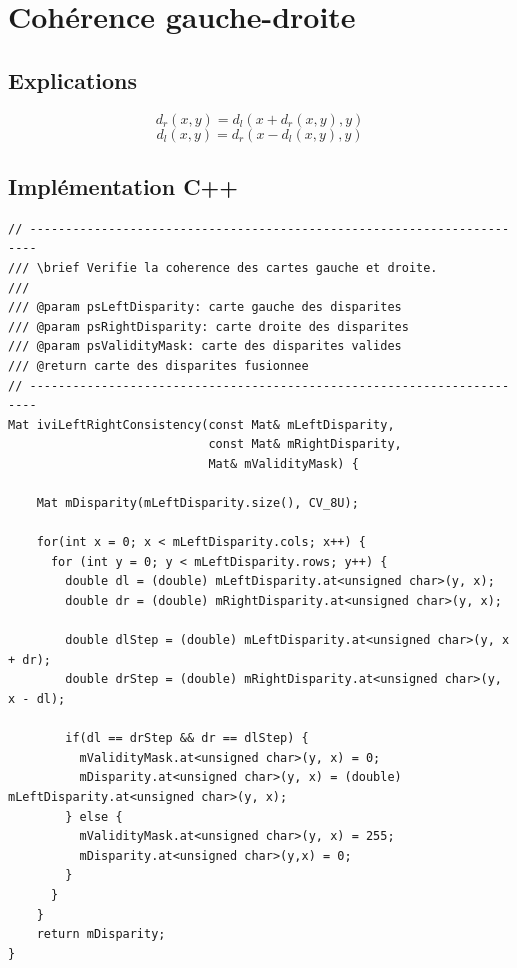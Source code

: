 \documentclass[a4paper]{article}
\begin{document}
\clearpage
\section{Cohérence gauche-droite}

\subsection{Explications}
\begin{equation}
  d_r(x,y) = d_l(x+d_r(x,y),y)
\end{equation}
\begin{equation}
  d_l(x,y) = d_r(x-d_l(x,y),y)
\end{equation}

\subsection{Implémentation C++}

\begin{lstlisting}
// -----------------------------------------------------------------------
/// \brief Verifie la coherence des cartes gauche et droite.
///
/// @param psLeftDisparity: carte gauche des disparites
/// @param psRightDisparity: carte droite des disparites
/// @param psValidityMask: carte des disparites valides
/// @return carte des disparites fusionnee
// -----------------------------------------------------------------------
Mat iviLeftRightConsistency(const Mat& mLeftDisparity,
                            const Mat& mRightDisparity,
                            Mat& mValidityMask) {

    Mat mDisparity(mLeftDisparity.size(), CV_8U);

    for(int x = 0; x < mLeftDisparity.cols; x++) {
      for (int y = 0; y < mLeftDisparity.rows; y++) {
        double dl = (double) mLeftDisparity.at<unsigned char>(y, x);
        double dr = (double) mRightDisparity.at<unsigned char>(y, x);

        double dlStep = (double) mLeftDisparity.at<unsigned char>(y, x + dr);
        double drStep = (double) mRightDisparity.at<unsigned char>(y, x - dl);

        if(dl == drStep && dr == dlStep) {
          mValidityMask.at<unsigned char>(y, x) = 0;
          mDisparity.at<unsigned char>(y, x) = (double) mLeftDisparity.at<unsigned char>(y, x);
        } else {
          mValidityMask.at<unsigned char>(y, x) = 255;
          mDisparity.at<unsigned char>(y,x) = 0;
        }
      }
    }
    return mDisparity;
}
\end{lstlisting}
\end{document}
